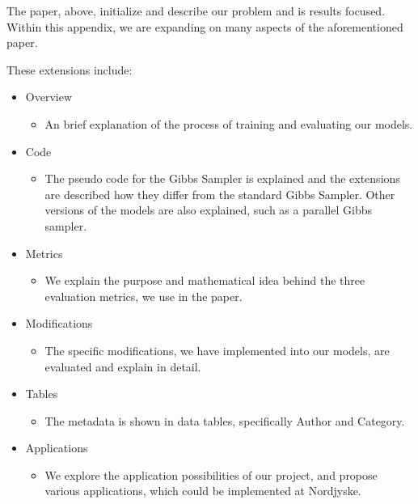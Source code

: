 The paper, above, initialize and describe our problem and is results focused.
Within this appendix, we are expanding on many aspects of the aforementioned paper.

These extensions include:
\begin{itemize}
	\item Overview
	\begin{itemize}
		\item An brief explanation of the process of training and evaluating our models.
	\end{itemize}
	\item Code
	\begin{itemize}
		\item The pseudo code for the Gibbs Sampler is explained and the extensions are described how they differ from the standard Gibbs Sampler. 
		Other versions of the models are also explained, such as a parallel Gibbs sampler.
	\end{itemize}
	\item Metrics 
	\begin{itemize}
		\item We explain the purpose and mathematical idea behind the three evaluation metrics, we use in the paper.
	\end{itemize}
	\item Modifications 
	\begin{itemize}
		\item The specific modifications, we have implemented into our models, are evaluated and explain in detail.
	\end{itemize}
	\item Tables
	\begin{itemize}
		\item The metadata is shown in data tables, specifically Author and Category.
	\end{itemize}
	\item Applications
	\begin{itemize}
		\item We explore the application possibilities of our project, and propose various applications, which could be implemented at Nordjyske.
	\end{itemize}
\end{itemize}
